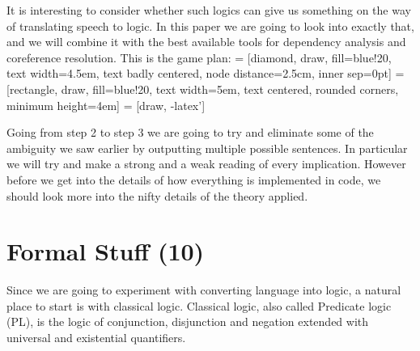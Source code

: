 \documentclass[12pt]{article}
\let\stdsection\section
\renewcommand\section{\newpage\stdsection}
\begin{document}
It is interesting to consider whether such logics can give us something on the way of translating speech to logic. In this paper we are going to look into exactly that, and we will combine it with the best available tools for dependency analysis and coreference resolution. This is the game plan:
\vspace{1em}
 = [diamond, draw, fill=blue!20,
    text width=4.5em, text badly centered, node distance=2.5cm, inner sep=0pt]
 = [rectangle, draw, fill=blue!20,
    text width=5em, text centered, rounded corners, minimum height=4em]
 = [draw, -latex']

Going from step 2 to step 3 we are going to try and eliminate some of the ambiguity we saw earlier by outputting multiple possible sentences. In particular we will try and make a strong and a weak reading of every implication. However before we get into the details of how everything is implemented in code, we should look more into the nifty details of the theory applied.

\section{Formal Stuff (10)}


Since we are going to experiment with converting language into logic, a natural place to start is with classical logic. Classical logic, also called Predicate logic (PL), is the logic of conjunction, disjunction and negation extended with universal and existential quantifiers.
\end{document}
